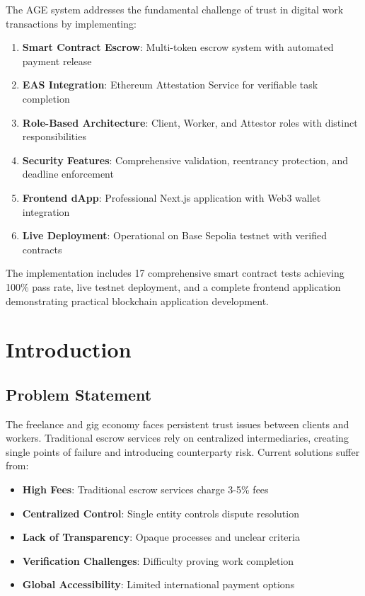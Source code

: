 \documentclass[12pt,a4paper]{article}
\begin{document}
The AGE system addresses the fundamental challenge of trust in digital work transactions by implementing:
\begin{enumerate}
    \item \textbf{Smart Contract Escrow}: Multi-token escrow system with automated payment release
    \item \textbf{EAS Integration}: Ethereum Attestation Service for verifiable task completion
    \item \textbf{Role-Based Architecture}: Client, Worker, and Attestor roles with distinct responsibilities
    \item \textbf{Security Features}: Comprehensive validation, reentrancy protection, and deadline enforcement
    \item \textbf{Frontend dApp}: Professional Next.js application with Web3 wallet integration
    \item \textbf{Live Deployment}: Operational on Base Sepolia testnet with verified contracts
\end{enumerate}

The implementation includes 17 comprehensive smart contract tests achieving 100\% pass rate, live testnet deployment, and a complete frontend application demonstrating practical blockchain application development.

\section{Introduction}

\subsection{Problem Statement}

The freelance and gig economy faces persistent trust issues between clients and workers. Traditional escrow services rely on centralized intermediaries, creating single points of failure and introducing counterparty risk. Current solutions suffer from:

\begin{itemize}
    \item \textbf{High Fees}: Traditional escrow services charge 3-5\% fees
    \item \textbf{Centralized Control}: Single entity controls dispute resolution
    \item \textbf{Lack of Transparency}: Opaque processes and unclear criteria
    \item \textbf{Verification Challenges}: Difficulty proving work completion
    \item \textbf{Global Accessibility}: Limited international payment options
\end{itemize}
\end{document}
